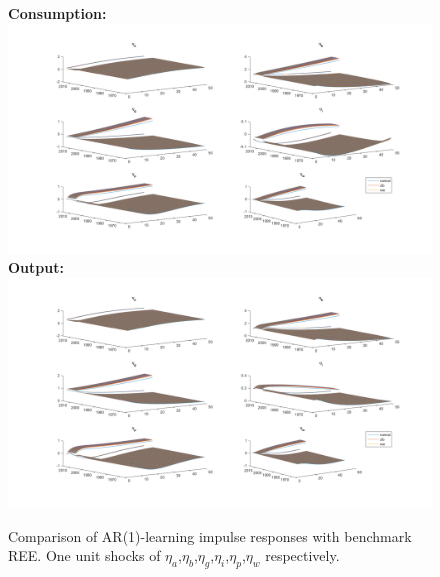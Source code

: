 \documentclass[12pt,reqno]{article}
\numberwithin{equation}{section}
\begin{document}
\begin{figure}[H]
\caption{Comparison of AR(1)-learning impulse responses with benchmark REE. One unit shocks of $\eta_a$,$\eta_b$,$\eta_g$,$\eta_i$,$\eta_p$,$\eta_w$ respectively.}
\textbf{Consumption:}\\
\includegraphics[scale=0.5]{AR1_impresp_cons_3d.pdf}
\textbf{Output:}\\
\includegraphics[scale=0.5]{AR1_impresp_output_3d.pdf}
\end{figure}
\end{document}
